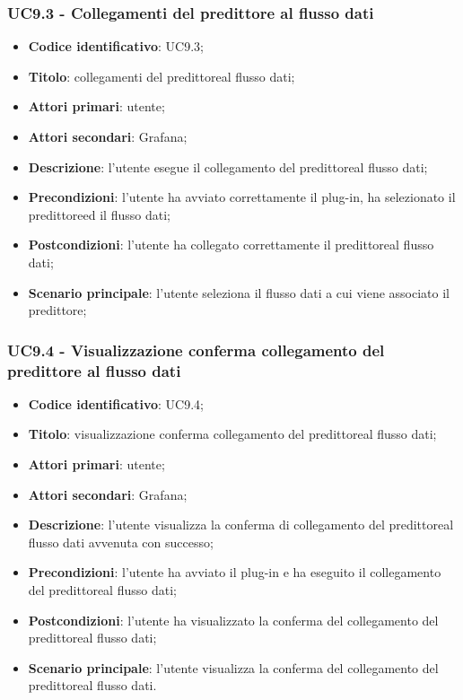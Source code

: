 \subsubsection{UC9.3 - Collegamenti del predittore al flusso dati}
\begin{itemize}
	\item \textbf{Codice identificativo}: UC9.3;
	\item \textbf{Titolo}: collegamenti del predittore\glosp al flusso dati;
	\item \textbf{Attori primari}: utente;
	\item \textbf{Attori secondari}: Grafana\glo;
	\item \textbf{Descrizione}: l'utente esegue il collegamento del predittore\glosp al flusso dati;
	\item \textbf{Precondizioni}: l'utente ha avviato correttamente il plug-in, ha selezionato il predittore\glosp ed il flusso dati;
	\item \textbf{Postcondizioni}: l'utente ha collegato correttamente il predittore\glosp al flusso dati;
	\item \textbf{Scenario principale}: l'utente seleziona il flusso dati a cui viene associato il predittore\glo;
\end{itemize}

\subsubsection{UC9.4 - Visualizzazione conferma collegamento del predittore al flusso dati}
\begin{itemize}
	\item \textbf{Codice identificativo}: UC9.4;
	\item \textbf{Titolo}: visualizzazione conferma collegamento del predittore\glosp al flusso dati;
	\item \textbf{Attori primari}: utente;
	\item \textbf{Attori secondari}: Grafana\glo;
	\item \textbf{Descrizione}: l'utente visualizza la conferma di collegamento del predittore\glosp al flusso dati avvenuta con successo;
	\item \textbf{Precondizioni}: l'utente ha avviato il plug-in e ha eseguito il collegamento del predittore\glosp al flusso dati;
	\item \textbf{Postcondizioni}: l'utente ha visualizzato la conferma del collegamento del predittore\glosp al flusso dati;
	\item \textbf{Scenario principale}: l'utente visualizza la conferma del collegamento del predittore\glosp al flusso dati.
\end{itemize}